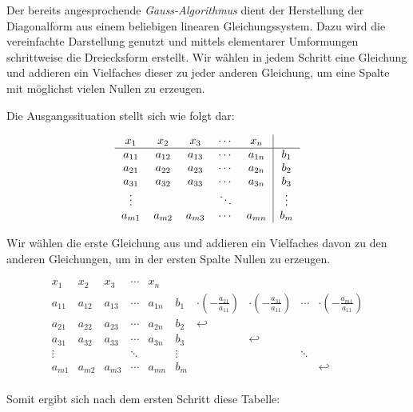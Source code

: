 			Der bereits angesprochende \emph{Gauss-Algorithmus} dient der Herstellung der Diagonalform aus einem beliebigen linearen Gleichungssystem.
			Dazu wird die vereinfachte Darstellung genutzt und mittels elementarer Umformungen schrittweise die Dreiecksform erstellt.
			Wir w\"ahlen in jedem Schritt eine Gleichung
			und addieren ein Vielfaches dieser zu jeder anderen Gleichung,
			um eine Spalte mit m\"oglichst vielen Nullen zu erzeugen.
			
			
			\noindent Die Ausgangssituation stellt sich wie folgt dar:
			
			\[
				\begin{tabular} {ccccc|c}
					$x_1$ & $x_2$ & $x_3$ & $\cdots$ & $x_n$ &\\
					\hline
					$a_{11}$ & $a_{12}$ & $a_{13}$ & $\cdots$ & $a_{1n}$ & $b_1$\\
					$a_{21}$ & $a_{22}$ & $a_{23}$ & $\cdots$ & $a_{2n}$ & $b_2$\\
					$a_{31}$ & $a_{32}$ & $a_{33}$ & $\cdots$ & $a_{3n}$ & $b_3$\\
					$\vdots$ & & & $\ddots$ & & $\vdots$\\
					$a_{m1}$ & $a_{m2}$ & $a_{m3}$ & $\cdots$ & $a_{mn}$ & $b_m$\\
				\end{tabular}
			\]
			
			\noindent Wir w\"ahlen die erste Gleichung aus und addieren ein Vielfaches davon zu den anderen Gleichungen,
			um in der ersten Spalte Nullen zu erzeugen.
			
			\[
				\begin{array} {ccccc|ccccc}
					x_1 & x_2 & x_3 & \cdots & x_n & & & & & \\
					\hline
					a_{11} & a_{12} & a_{13} & \cdots & a_{1n} & b_1 & \cdot(-\frac {a_{21}} {a_{11}}) & \cdot(-\frac {a_{31}} {a_{11}}) & \cdots & \cdot(-\frac {a_{m1}} {a_{11}})\\
					a_{21} & a_{22} & a_{23} & \cdots & a_{2n} & b_2 & \hookleftarrow & & &  \\
					a_{31} & a_{32} & a_{33} & \cdots & a_{3n} & b_3 & & \hookleftarrow & &  \\
					\vdots & & & \ddots & & \vdots & & & \ddots & \\
					a_{m1} & a_{m2} & a_{m3} & \cdots & a_{mn} & b_m & & & & \hookleftarrow  \\
				\end{array}
			\]
			
			\noindent Somit ergibt sich nach dem ersten Schritt diese Tabelle:
			
